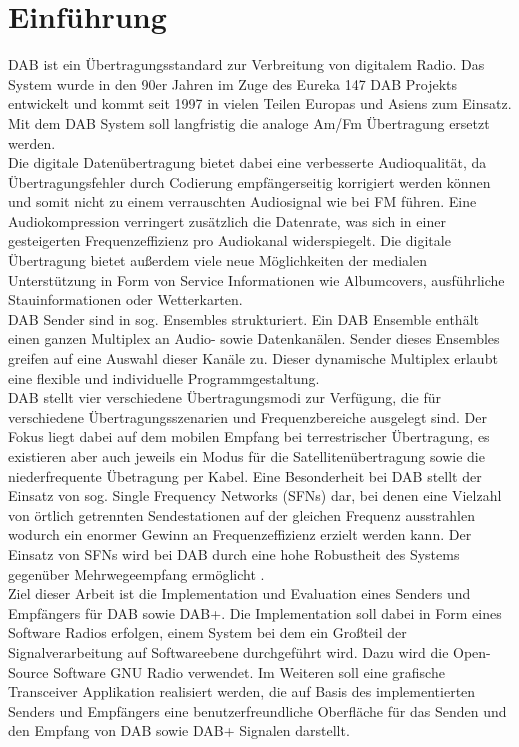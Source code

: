 \chapter{Einführung}
\label{sec:intro}
\ac{DAB} ist ein Übertragungsstandard zur Verbreitung von digitalem Radio. Das System wurde in den 90er Jahren im Zuge des Eureka 147 DAB Projekts entwickelt und kommt seit 1997 in vielen Teilen Europas und Asiens zum Einsatz. Mit dem DAB System soll langfristig die analoge Am/Fm Übertragung ersetzt werden.\\
Die digitale Datenübertragung bietet dabei eine verbesserte Audioqualität, da Übertragungsfehler durch Codierung empfängerseitig korrigiert werden können und somit nicht zu einem verrauschten Audiosignal wie bei FM führen. Eine Audiokompression verringert zusätzlich die Datenrate, was sich in einer gesteigerten Frequenzeffizienz pro Audiokanal widerspiegelt. Die digitale Übertragung bietet außerdem viele neue Möglichkeiten der medialen Unterstützung in Form von Service Informationen wie Albumcovers, ausführliche Stauinformationen oder Wetterkarten.\\
DAB Sender sind in sog. Ensembles strukturiert. Ein DAB Ensemble enthält einen ganzen Multiplex an Audio- sowie Datenkanälen. Sender dieses Ensembles greifen auf eine Auswahl dieser Kanäle zu. Dieser dynamische Multiplex erlaubt eine flexible und individuelle Programmgestaltung. \\
DAB stellt vier verschiedene Übertragungsmodi zur Verfügung, die für verschiedene Übertragungsszenarien und Frequenzbereiche ausgelegt sind. Der Fokus liegt dabei auf dem mobilen Empfang bei terrestrischer Übertragung, es existieren aber auch jeweils ein Modus für die Satellitenübertragung sowie die niederfrequente Übetragung per Kabel. Eine Besonderheit bei DAB stellt der Einsatz von sog. Single Frequency Networks (SFNs) dar, bei denen eine Vielzahl von örtlich getrennten Sendestationen auf der gleichen Frequenz ausstrahlen wodurch ein enormer Gewinn an Frequenzeffizienz erzielt werden kann. Der Einsatz von SFNs wird bei DAB durch eine hohe Robustheit des Systems gegenüber Mehrwegeempfang ermöglicht \cite{dab_buch}. \\
Ziel dieser Arbeit ist die Implementation und Evaluation eines Senders und Empfängers für DAB sowie DAB+. Die Implementation soll dabei in Form eines Software Radios erfolgen, einem System bei dem ein Großteil der Signalverarbeitung auf Softwareebene durchgeführt wird. Dazu wird die Open-Source Software GNU Radio verwendet. Im Weiteren soll eine grafische Transceiver Applikation realisiert werden, die auf Basis des implementierten Senders und Empfängers eine benutzerfreundliche Oberfläche für das Senden und den Empfang von DAB sowie DAB+ Signalen darstellt.

